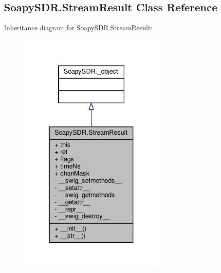\subsection{Soapy\+S\+D\+R.\+Stream\+Result Class Reference}
\label{classSoapySDR_1_1StreamResult}


Inheritance diagram for Soapy\+S\+D\+R.\+Stream\+Result\+:
\nopagebreak
\begin{figure}[H]
\begin{center}
\leavevmode
\includegraphics[width=209pt]{d8/dfb/classSoapySDR_1_1StreamResult__inherit__graph}
\end{center}
\end{figure}



